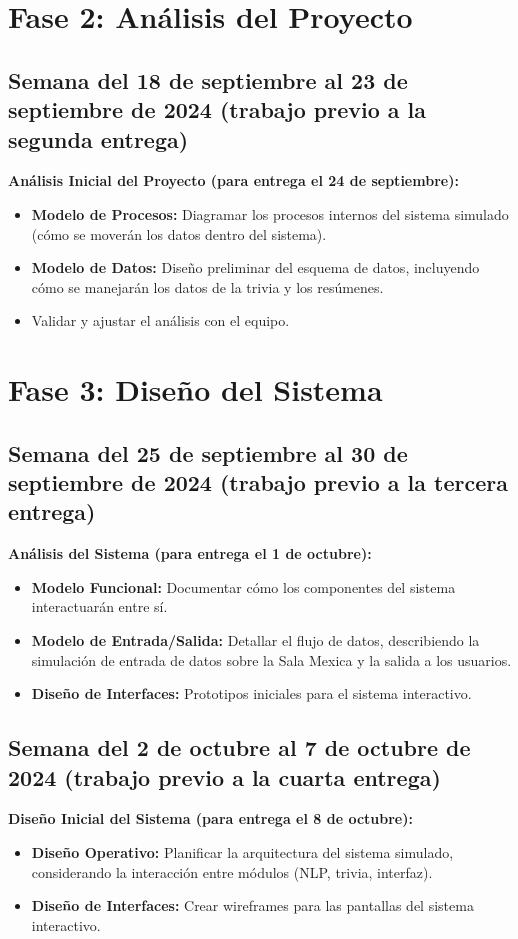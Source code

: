 \documentclass{report}
\begin{document}
    \section*{Fase 2: Análisis del Proyecto}
    \subsection*{Semana del 18 de septiembre al 23 de septiembre de 2024 (trabajo previo a la segunda entrega)}
    \textbf{Análisis Inicial del Proyecto (para entrega el 24 de septiembre):}
    \begin{itemize}
        \item \textbf{Modelo de Procesos:} Diagramar los procesos internos del sistema simulado (cómo se moverán los datos dentro del sistema).
        \item \textbf{Modelo de Datos:} Diseño preliminar del esquema de datos, incluyendo cómo se manejarán los datos de la trivia y los resúmenes.
        \item Validar y ajustar el análisis con el equipo.
    \end{itemize}

    \section*{Fase 3: Diseño del Sistema}
    \subsection*{Semana del 25 de septiembre al 30 de septiembre de 2024 (trabajo previo a la tercera entrega)}
    \textbf{Análisis del Sistema (para entrega el 1 de octubre):}
    \begin{itemize}
        \item \textbf{Modelo Funcional:} Documentar cómo los componentes del sistema interactuarán entre sí.
        \item \textbf{Modelo de Entrada/Salida:} Detallar el flujo de datos, describiendo la simulación de entrada de datos sobre la Sala Mexica y la salida a los usuarios.
        \item \textbf{Diseño de Interfaces:} Prototipos iniciales para el sistema interactivo.
    \end{itemize}

    \subsection*{Semana del 2 de octubre al 7 de octubre de 2024 (trabajo previo a la cuarta entrega)}
    \textbf{Diseño Inicial del Sistema (para entrega el 8 de octubre):}
    \begin{itemize}
        \item \textbf{Diseño Operativo:} Planificar la arquitectura del sistema simulado, considerando la interacción entre módulos (NLP, trivia, interfaz).
        \item \textbf{Diseño de Interfaces:} Crear wireframes para las pantallas del sistema interactivo.
    \end{itemize}
\end{document}

